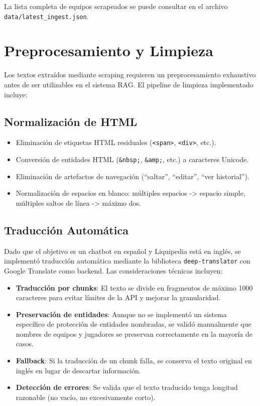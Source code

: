 La lista completa de equipos scrapeados se puede consultar en el archivo \texttt{data/latest\_ingest.json}.

\section{Preprocesamiento y Limpieza}

Los textos extraídos mediante scraping requieren un preprocesamiento exhaustivo antes de ser utilizables en el sistema RAG. El pipeline de limpieza implementado incluye:

\subsection{Normalización de HTML}

\begin{itemize}
    \item Eliminación de etiquetas HTML residuales (\texttt{<span>}, \texttt{<div>}, etc.).
    \item Conversión de entidades HTML (\texttt{\&nbsp;}, \texttt{\&amp;}, etc.) a caracteres Unicode.
    \item Eliminación de artefactos de navegación (``saltar'', ``editar'', ``ver historial'').
    \item Normalización de espacios en blanco: múltiples espacios -> espacio simple, múltiples saltos de línea -> máximo dos.
\end{itemize}

\subsection{Traducción Automática}

Dado que el objetivo es un chatbot en español y Liquipedia está en inglés, se implementó traducción automática mediante la biblioteca \texttt{deep-translator} con Google Translate como backend. Las consideraciones técnicas incluyen:

\begin{itemize}
    \item \textbf{Traducción por chunks}: El texto se divide en fragmentos de máximo 1000 caracteres para evitar límites de la API y mejorar la granularidad.
    
    \item \textbf{Preservación de entidades}: Aunque no se implementó un sistema específico de protección de entidades nombradas, se validó manualmente que nombres de equipos y jugadores se preservan correctamente en la mayoría de casos.
    
    \item \textbf{Fallback}: Si la traducción de un chunk falla, se conserva el texto original en inglés en lugar de descartar información.
    
    \item \textbf{Detección de errores}: Se valida que el texto traducido tenga longitud razonable (no vacío, no excesivamente corto).
\end{itemize}

